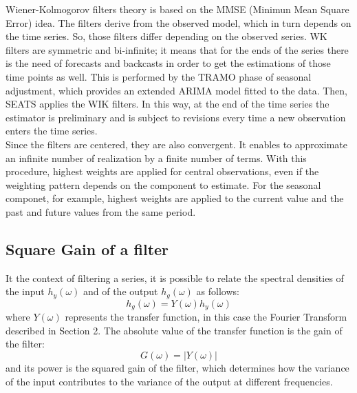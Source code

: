 \documentclass[english,blauw]{cbsdiscussionpaper}
\begin{document}
Wiener-Kolmogorov filters theory is based on the MMSE (Minimun Mean Square Error) idea. The filters derive from the observed model, which in turn depends on the time series. So, those filters differ depending on the observed series. WK filters are symmetric and bi-infinite; it means that for the ends of the series there is the need of forecasts and backcasts in order to get the estimations of those time points as well. This is performed by the TRAMO phase of seasonal adjustment, which provides an extended ARIMA model fitted to the data. Then, SEATS applies the WIK filters.  In this way, at the end of the time series the estimator is preliminary and is subject to revisions every time a new observation enters the time series.\\ Since the filters are centered, they are also convergent. It enables to approximate an infinite number of realization by a finite number of terms. With this procedure, highest weights are applied for central observations, even if the weighting pattern depends on the component to estimate. For the seasonal componet, for example, highest weights are applied to the current value and the past and future values from the same period.
\subsection*{Square Gain of a filter}
It the context of filtering a series, it is possible to relate the spectral densities of the input $h_{y}(\omega)$ and of the output $h_{g}(\omega)$ as follows:
\begin{equation*}
h_{g}(\omega)=Y(\omega) h_{y}(\omega)
\end{equation*}
where $Y(\omega)$ represents the transfer function, in this case the Fourier Transform described in Section 2. The absolute value of the transfer function is the gain of the filter:
\begin{equation*}
G(\omega)=|Y(\omega)|
\end{equation*} 
and its power is the squared gain of the filter, which determines how the variance of the input contributes to the variance of the output at different frequencies.
\newpage


\end{document}
